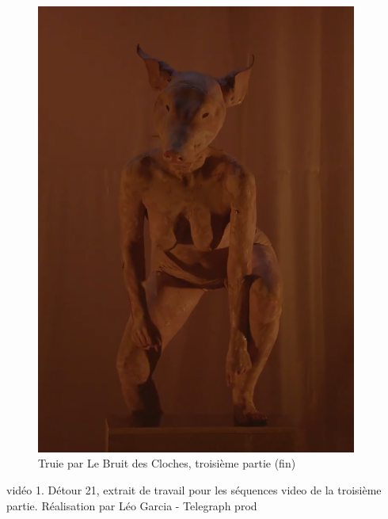 \documentclass[
]{article}
\begin{document}
\begin{figure}
\centering
\includegraphics[width=10.555cm,height=14.891cm]{../assets/Pictures/100002010000028700000391A91BA4932910F52F.png}
\caption{Truie par Le Bruit des Cloches, troisième partie (fin)}\label{fig:fig-1-6}
\end{figure}

\label{video-1}
{vidéo 1.} Détour 21, extrait de travail pour les séquences video de la troisième partie. Réalisation par Léo Garcia - Telegraph prod
\end{document}
